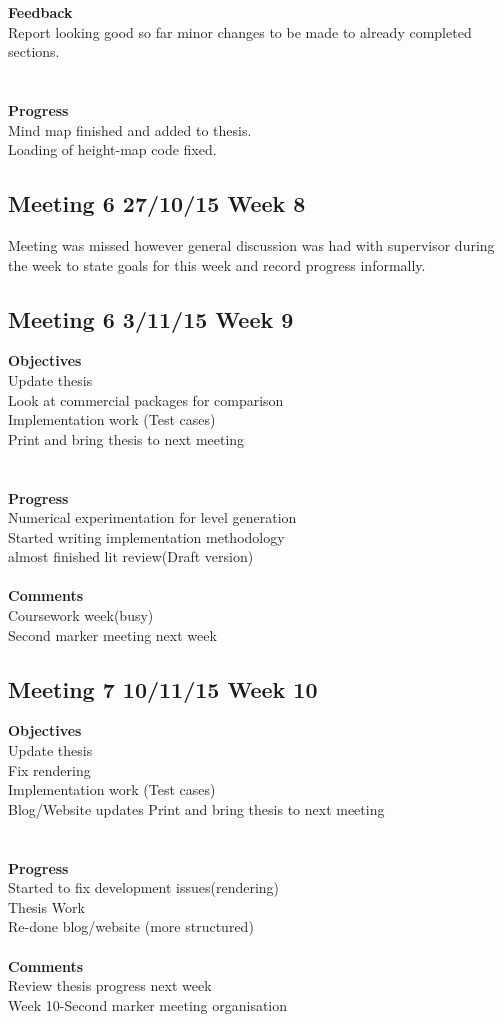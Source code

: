 \textbf{Feedback}\\
Report looking good so far minor changes to be made to already completed sections.\\
\\\\\textbf{Progress}\\
Mind map finished and added to thesis.\\
Loading of height-map code fixed. 

\subsection{Meeting 6 27/10/15 Week 8}
Meeting was missed however general discussion was had with supervisor during the week to state goals for this week and record progress informally. 

\subsection{Meeting 6 3/11/15 Week 9}

\textbf{Objectives}\\
Update thesis\\
Look at commercial packages for comparison\\
Implementation work (Test cases)\\
Print and bring thesis to next meeting \\
\\\\\textbf{Progress}\\
Numerical experimentation for level generation\\
Started writing implementation methodology\\
almost finished lit review(Draft version)\\\\\textbf{Comments}\\
Coursework week(busy)\\
Second marker meeting next week

\subsection{Meeting 7 10/11/15 Week 10}

\textbf{Objectives}\\
Update thesis\\
Fix rendering\\
Implementation work (Test cases)\\
Blog/Website updates
Print and bring thesis to next meeting \\
\\\\\textbf{Progress}\\
Started to fix development issues(rendering)\\
Thesis Work\\
Re-done blog/website (more structured)
\\\\\textbf{Comments}\\
Review thesis progress next week\\
Week 10-Second marker meeting organisation  

